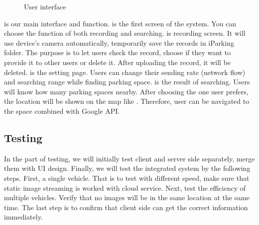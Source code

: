 \documentclass[preprint,12pt]{elsarticle}
\begin{document}
\begin{figure}[tbp]
{		\label{fig:userResult}
	}
	\hspace{0.1in}
	\caption{User interface}
	\label{fig:userInterface}
\end{figure}

 is our main interface and function.
 is the first screen of the system. You
can choose the function of both recording and searching.
 is recording screen. It will use device's
camera automatically, temporarily save the records in iParking
folder. The purpose is to let users check the
record, choose if they want to provide it to other users or delete it. After
uploading the record, it will be deleted. 
is the setting page. Users can change their sending rate (network flow)
and searching range while finding parking space.
 is the result of searching. Users will know
how many parking spaces nearby. After choosing the one user prefers,
the location will be shown on the map like .
Therefore, user can be navigated to the space combined with Google API.

\subsection{Testing}

In the part of testing, we will initially test client and server side
separately, merge them with UI design. Finally, we will test
the integrated system by the following steps. First, a single vehicle.
That is to test with different speed, make sure that static image
streaming is worked with cloud service. Next, test the efficiency of
multiple vehicles. Verify that no images will be in the same
location at the same time. The last step is to confirm that client side
can get the correct information immediately.
\end{document}
